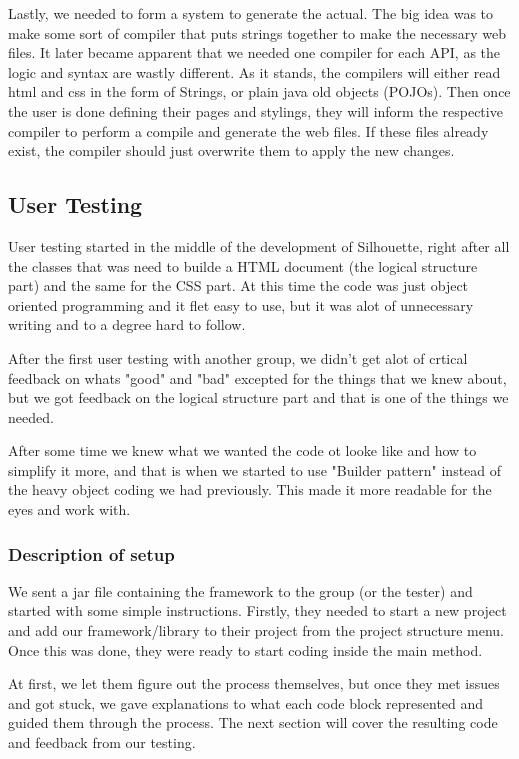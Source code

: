 \documentclass[12pt]{article}
\begin{document}
    Lastly, we needed to form a system to generate the actual. The big idea was to make some sort of compiler that puts strings together to make the necessary web files. It later became apparent that we needed one compiler for each API, as the logic and syntax are wastly different. As it stands, the compilers will either read html and css in the form of Strings, or plain java old objects (POJOs). Then once the user is done defining their pages and stylings, they will inform the respective compiler to perform a compile and generate the web files. If these files already exist, the compiler should just overwrite them to apply the new changes.


    \subsection{User Testing}
    User testing started in the middle of the development of Silhouette, right after all the classes that was need to builde a HTML document (the logical structure part) and the same for the CSS part. At this time the code was just object oriented programming and it flet easy to use, but it was alot of unnecessary writing and to a degree hard to follow.   
        
    After the first user testing with another group, we didn't get alot of crtical feedback on whats "good" and "bad" excepted for the things that we knew about, but we got feedback on the logical structure part and that is one of the things we needed.
        
    After some time we knew what we wanted the code ot looke like and how to simplify it more, and that is when we started to use "Builder pattern" instead of the heavy object coding we had previously. This made it more readable for the eyes and work with.

        \subsubsection{Description of setup}
        We sent a jar file containing the framework to the group (or the tester) and started with some simple instructions. Firstly, they needed to start a new project and add our framework/library to their project from the project structure menu. Once this was done, they were ready to start coding inside the main method.
        
        At first, we let them figure out the process themselves, but once they met issues and got stuck, we gave explanations to what each code block represented and guided them through the process. The next section will cover the resulting code and feedback from our testing.
\end{document}

